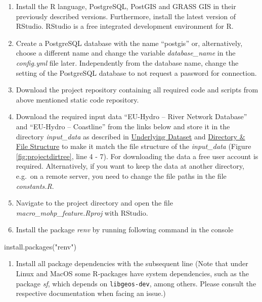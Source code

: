 \documentclass[fleqn,10pt]{wlscirep}
\providecommand{\tightlist}{%
  \setlength{\itemsep}{0pt}\setlength{\parskip}{0pt}}
\newenvironment{Shaded}{\begin{snugshade}}{\end{snugshade}}
\newcommand{\FunctionTok}[1]{\textcolor[rgb]{0.00,0.00,0.00}{#1}}
\newcommand{\NormalTok}[1]{#1}
\newcommand{\StringTok}[1]{\textcolor[rgb]{0.31,0.60,0.02}{#1}}
\begin{document}
\begin{enumerate}
\def\labelenumi{\arabic{enumi}.}
\item
  Install the R language, PostgreSQL, PostGIS and GRASS GIS in their previously described versions. Furthermore, install the latest version of RStudio. RStudio is a free integrated development environment for R.
\item
  Create a PostgreSQL database with the name ``postgis'' or, alternatively, choose a different name and change the variable \emph{database\_name} in the \emph{config.yml} file later. Independently from the database name, change the setting of the PostgreSQL database to not request a password for connection.
\item
  Download the project repository containing all required code and scripts from above mentioned static code repository.
\item
  Download the required input data ``EU-Hydro -- River Network Database''\cite{noauthor_eu-hydro_2021} and ``EU-Hydro -- Coastline''\cite{noauthor_eu-hydro_2021-1} from the links below and store it in the directory \emph{input\_data} as described in \protect\hyperlink{underlying-dataset}{Underlying Dataset} and \protect\hyperlink{directory-file-structure}{Directory \& File Structure} to make it match the file structure of the \emph{input\_data} (Figure \ref{fig:projectdirtree}, line 4 - 7). For downloading the data a free user account is required. Alternatively, if you want to keep the data at another directory, e.g.~on a remote server, you need to change the file paths in the file \emph{constants.R}.
\item
  Navigate to the project directory and open the file \emph{macro\_mohp\_feature.Rproj} with RStudio.
\item
  Install the package \emph{renv} by running following command in the console
\end{enumerate}

\small

\begin{Shaded}
\begin{Highlighting}[]
\FunctionTok{install.packages}\NormalTok{(}\StringTok{"renv"}\NormalTok{)}
\end{Highlighting}
\end{Shaded}

\normalsize

\begin{enumerate}
\def\labelenumi{\arabic{enumi}.}
\setcounter{enumi}{6}
\tightlist
\item
  Install all package dependencies with the subsequent line (Note that under Linux and MacOS some R-packages have system dependencies, such as the package \emph{sf}, which depends on \texttt{libgeos-dev}, among others. Please consult the respective documentation when facing an issue.)
\end{enumerate}
\end{document}
